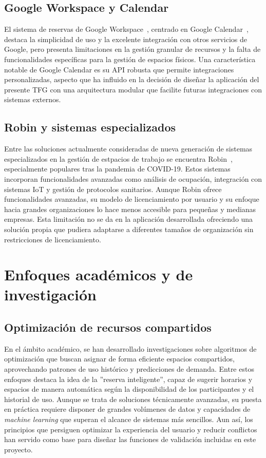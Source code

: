 \subsection{Google Workspace y Calendar}\label{google-workspace-calendar}
El sistema de reservas de Google Workspace~\cite{google-workspace}, centrado en Google Calendar~\cite{google-calendar}, destaca la simplicidad de uso y la excelente integración con otros servicios de Google, pero presenta limitaciones en la gestión granular de recursos y la falta de funcionalidades específicas para la gestión de espacios físicos.
Una característica notable de Google Calendar es su API robusta que permite integraciones personalizadas, aspecto que ha influido en la decisión de diseñar la aplicación del presente TFG con una arquitectura modular que facilite futuras integraciones con sistemas externos.\\

\subsection{Robin y sistemas especializados}\label{robin-sistemas-especializados}
Entre las soluciones actualmente consideradas de nueva generación de sistemas especializados en la gestión de estpacios de trabajo se encuentra Robin~\cite{robin}, especialmente populares tras la pandemia de COVID-19. Estos sistemas incorporan funcionalidades avanzadas como análisis de ocupación, integración con sistemas IoT y gestión de protocolos sanitarios.
Aunque Robin ofrece funcionalidades avanzadas, su modelo de licenciamiento por usuario y su enfoque hacia grandes organizaciones lo hace menos accesible para pequeñas y medianas empresas. Esta limitación no se da en la aplicación desarrollada ofreciendo una solución propia que pudiera adaptarse a diferentes tamaños de organización sin restricciones de licenciamiento.\\

\section{Enfoques académicos y de investigación}\label{enfoques-academicos-investigacion}
\subsection{Optimización de recursos compartidos}\label{optimizacion-recursos-compartidos}
En el ámbito académico, se han desarrollado investigaciones sobre algoritmos de optimización que buscan asignar de forma eficiente espacios compartidos, aprovechando patrones de uso histórico y predicciones de demanda. Entre estos enfoques destaca la idea de la ''reserva inteligente'', capaz de sugerir horarios y espacios de manera automática según la disponibilidad de los participantes y el historial de uso.
Aunque se trata de soluciones técnicamente avanzadas, su puesta en práctica requiere disponer de grandes volúmenes de datos y capacidades de \emph{machine learning} que superan el alcance de sistemas más sencillos. Aun así, los principios que persiguen optimizar la experiencia del usuario y reducir conflictos han servido como base para diseñar las funciones de validación incluidas en este proyecto.\\


